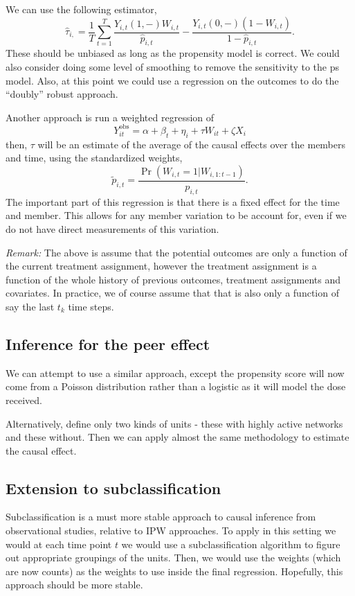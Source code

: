 \documentclass[a4paper]{article}
\begin{document}
We can use the following estimator,
\[
	\hat \tau_{i,} = \frac{1}{T} \sum_{t=1}^T \frac{Y_{i,t }(1,-) W_{i,t}}{\hat p_{i,t}} - 
	\frac{Y_{i,t }(0,-) (1 - W_{i,t})}{1 - \hat p_{i,t}}.
\]
These should be unbiased as long as the propensity model is correct. We could also consider doing some level of smoothing to remove the sensitivity to the ps model. Also, at this point we could use a regression on the outcomes to do the ``doubly'' robust approach. 

Another approach is run a weighted regression of 
\[
	Y^\text{obs}_{it} = \alpha + \beta_t + \eta_{i} + \tau W_{it} + \zeta X_{i}
\]
then, $\tau$ will be an estimate of the average of the causal effects over the members and time, using the standardized weights,
\[
	\tilde p_{i,t} = \frac{\Pr(W_{i,t} = 1 | W_{i,1:t-1})} { p_{i,t}}.
\]
The important part of this regression is that there is a fixed effect for the time and member. This allows for any member variation to be account for, even if we do not have direct measurements of this variation.

\emph{Remark:} The above is assume that the potential outcomes are only a function of the current treatment assignment, however the treatment assignment is a function of the whole history of previous outcomes, treatment assignments and covariates. In practice, we of course assume that that is also only a function of say the last $t_k$ time steps. 

\subsection{Inference for the peer effect} %
\label{sub:inference_for_the_peer_effect}

We can attempt to use a similar approach, except the propensity score will now come from a Poisson distribution rather than a logistic as it will model the dose received. 

Alternatively, define only two kinds of units - these with highly active networks and these without. Then we can apply almost the same methodology to estimate the causal effect. 


\subsection{Extension to subclassification} %
\label{sub:extension_to_subclassification}

Subclassification is a must more stable approach to causal inference from observational studies, relative to IPW approaches. To apply in this setting we would at each time point $t$ we would use a subclassification algorithm to figure out appropriate groupings of the units. Then, we would use the weights (which are now counts) as the weights to use inside the final regression. Hopefully, this approach should be more stable. 
\end{document}

